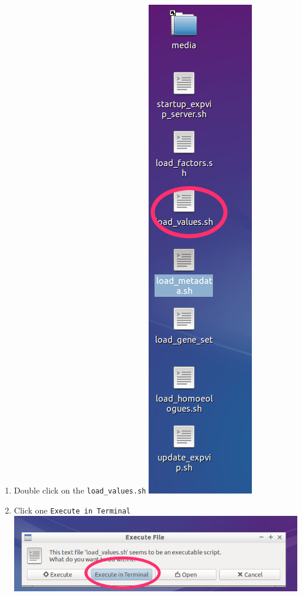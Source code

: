 \begin{enumerate}
\def\labelenumi{\arabic{enumi}.}
\itemsep1pt\parskip0pt
\item
  Double click on the \lstinline!load_values.sh!
  \includegraphics{images/LoadValues01.png}
\item
  Click one \lstinline!Execute in Terminal!
  \includegraphics{images/LoadValues02.png}

\end{enumerate}
